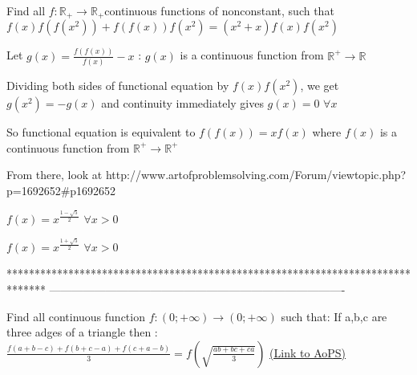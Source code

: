 \begin{solution}
	\begin{tcolorbox}Find all $f: \mathbb{R_+}\to\mathbb{R_+}$continuous functions of nonconstant, such that
$f(x)f(f(x^2))+f(f(x))f(x^2)=(x^2+x)f(x)f(x^2)$\end{tcolorbox}

Let $g(x)=\frac{f(f(x))}{f(x)}-x$ : $g(x)$ is a continuous function from $\mathbb R^+\to\mathbb R$

Dividing both sides of functional equation by $f(x)f(x^2)$, we get $g(x^2)=-g(x)$ and continuity immediately gives $g(x)=0$ $\forall x$

So functional equation is equivalent to $f(f(x))=xf(x)$ where $f(x)$ is a continuous function from $\mathbb R^+\to\mathbb R^+$

From there, look at http://www.artofproblemsolving.com/Forum/viewtopic.php?p=1692652#p1692652


$f(x)=x^{\frac{1-\sqrt 5}2}$ $\forall x>0$

$f(x)=x^{\frac{1+\sqrt 5}2}$ $\forall x>0$
\end{solution}
*******************************************************************************
-------------------------------------------------------------------------------

\begin{problem}
	Find all continuous function $f : (0; +\infty) \to  (0; +\infty) $ such that: If a,b,c are three adges of a triangle then : $ \frac{f(a+b-c) + f(b+c-a) + f(c+a-b)}{3} = f(\sqrt{\frac{ab+bc+ca}{3}}) $
	\flushright \href{https://artofproblemsolving.com/community/c6h478462}{(Link to AoPS)}
\end{problem}



